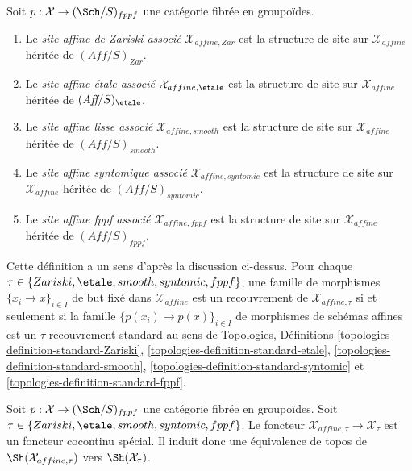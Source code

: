 \begin{definition}
\label{definition-alternative-inherited-topologies}
Soit $p : \mathcal{X} \to (\Sch/S)_{fppf}$ une catégorie fibrée en groupoïdes.
\begin{enumerate}
\item Le {\it site affine de Zariski associé} $\mathcal{X}_{affine, Zar}$
est la structure de site sur $\mathcal{X}_{affine}$ héritée de
$(\textit{Aff}/S)_{Zar}$.
\item Le {\it site affine \'etale associé} $\mathcal{X}_{affine, \etale}$
est la structure de site sur $\mathcal{X}_{affine}$ héritée de
$(\textit{Aff}/S)_\etale$.
\item Le {\it site affine lisse associé}
$\mathcal{X}_{affine, smooth}$
est la structure de site sur $\mathcal{X}_{affine}$ héritée de
$(\textit{Aff}/S)_{smooth}$.
\item Le {\it site affine syntomique associé} $\mathcal{X}_{affine, syntomic}$
est la structure de site sur $\mathcal{X}_{affine}$ héritée de
$(\textit{Aff}/S)_{syntomic}$.
\item Le {\it site affine fppf associé} $\mathcal{X}_{affine, fppf}$
est la structure de site sur $\mathcal{X}_{affine}$ héritée de
$(\textit{Aff}/S)_{fppf}$.
\end{enumerate}
\end{definition}

\noindent
Cette définition a un sens d'après la discussion ci-dessus. Pour chaque
$\tau \in \{Zariski,\allowbreak \etale,\allowbreak smooth,\allowbreak
syntomic,\allowbreak fppf\}$, une
famille de morphismes $\{x_i \to x\}_{i \in I}$ de but fixé
dans $\mathcal{X}_{affine}$ est un recouvrement de $\mathcal{X}_{affine, \tau}$
si et seulement si la famille $\{p(x_i) \to p(x)\}_{i \in I}$
de morphismes de schémas affines est un $\tau$-recouvrement standard au sens de
Topologies, Définitions
\ref{topologies-definition-standard-Zariski},
\ref{topologies-definition-standard-etale},
\ref{topologies-definition-standard-smooth},
\ref{topologies-definition-standard-syntomic} et
\ref{topologies-definition-standard-fppf}.

\begin{lemma}
\label{lemma-alternative}
Soit $p : \mathcal{X} \to (\Sch/S)_{fppf}$ une catégorie fibrée en groupoïdes.
Soit $\tau \in \{Zariski, \etale, smooth, syntomic, fppf\}$. Le foncteur
$\mathcal{X}_{affine, \tau} \to \mathcal{X}_\tau$ est un foncteur
cocontinu spécial. Il induit donc une équivalence de topos
de $\Sh(\mathcal{X}_{affine, \tau})$ vers $\Sh(\mathcal{X}_\tau)$.
\end{lemma}

